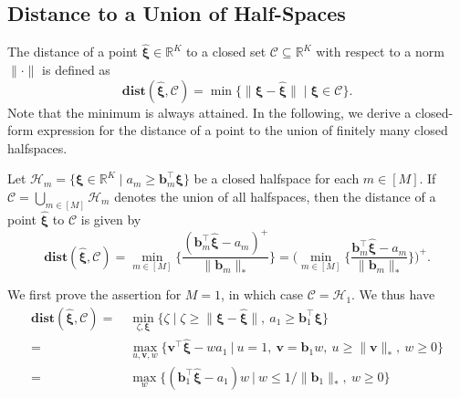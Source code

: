 \documentclass[nonblindrev]{informs2017}
\newcommand{\bmh}[1]{\hat{\bm{#1}}}
\newcommand{\1}[1]{\mathds{1}{\left(#1\right)}}
\begin{document}
\newpage
\begin{appendices}
\section{Distance to a Union of Half-Spaces}		
The distance of a point $\bmh{\xi} \in \mathbb{R}^K $ to a closed set $\mathcal{C} \subseteq \mathbb{R}^K$ with respect to a norm $\|\cdot\|$ is defined as 
$$
\mathbf{dist}(\bmh{\xi}, \mathcal{C}) = \min\{\|\bm{\xi} - \bmh{\xi}\| \mid \bm{\xi} \in \mathcal{C}\}.
$$
Note that the minimum is always attained. In the following, we derive a closed-form expression for the distance of a point to the union of finitely many closed halfspaces.
\begin{lemma}
\label{lem:distance to the union of closed half-spaces}
Let $\mathcal{H}_m = \{\bm{\xi} \in \mathbb{R}^K \mid a_m \geq \bm{b}^\top_m \bm{\xi}\}$ be a closed halfspace for each $m \in [M]$. If $\mathcal{C} = \bigcup_{m \in [M]} \mathcal{H}_m$ denotes the union of all halfspaces, then the distance of a point $\bmh{\xi}$ to $\mathcal{C}$ is given by
\begin{equation}
\nonumber
\label{equ:distance to the union of closed half-spaces}
\mathbf{dist}(\bmh{\xi}, \mathcal{C}) = \min_{m \in [M]} \bigg\{\dfrac{(\bm{b}^\top_m\bmh{\xi} - a_m)^+}{\|\bm{b}_m\|_*}\bigg\} = \bigg(\min_{m \in [M]} \bigg\{\dfrac{\bm{b}^\top_m\bmh{\xi} - a_m}{\|\bm{b}_m\|_*}\bigg\}\bigg)^+.
\end{equation}
\end{lemma}
We first prove the assertion for $M=1$, in which case $\mathcal{C} = \mathcal{H}_1$. %
We thus have
\begin{align*}
\mathbf{dist}(\bmh{\xi}, \mathcal{C}) =~& \min_{\zeta, \bm{\xi}} \big\{ \zeta \mid \zeta \geq \|\bm{\xi} - \bmh{\xi}\| , ~ a_1 \geq \bm{b}^\top_1\bm{\xi} \big\} \\
=~ &  \max_{u, \bm{v}, w} \big\{\bm{v}^\top\bmh{\xi} - w a_1  ~\big|~  u = 1 ,~ \bm{v} =  \bm{b}_1 w, ~ u \geq \|\bm{v}\|_*, ~w \geq 0 \big\}\\
=~ &  \max_{ w} \big\{(\bm b_1^\top \bmh{\xi}- a_1) w ~\big|~ w\le 1/ \|\bm{b}_1\|_*, ~w \geq 0\big\} \\

\end{align*}
\end{appendices}
\end{document}
